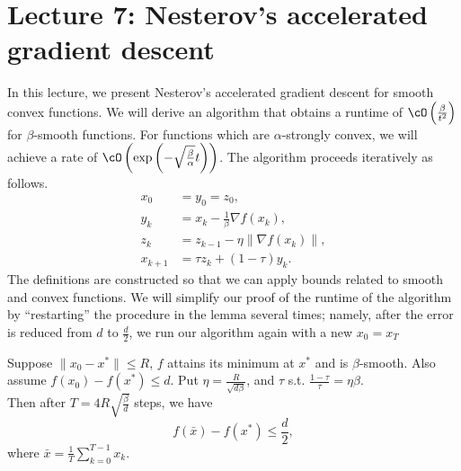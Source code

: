 \section{Lecture 7: Nesterov’s accelerated gradient descent}

In this lecture, we present Nesterov's accelerated gradient descent for smooth convex functions. We will derive an algorithm that obtains a runtime of $\cO \left(\frac{\beta}{t^2}\right)$ for $\beta$-smooth functions. For functions which are $\alpha$-strongly convex, we will achieve a rate of $\cO \left(\exp\left( -\sqrt{\frac{\beta}{\alpha}} t \right) \right)$. The algorithm proceeds iteratively as follows. 
\begin{align*}
x_0 &= y_0 = z_0, \\
y_k &= x_k - \frac{1}{\beta} \nabla f(x_k), \\
z_k &= z_{k -1} - \eta \|\nabla f(x_k)\|, \\
x_{k+1} &= \tau z_k + (1 - \tau) y_k.
\end{align*}
The definitions are constructed so that we can apply bounds related to smooth and convex functions. We will simplify our proof of the runtime of the algorithm by ``restarting'' the procedure in the lemma several times; namely, after the error is reduced from $d$ to $\frac{d}{2}$, we run our algorithm again with a new $x_0 = x_T$

\begin{lemma}
Suppose $\|x_0 - x^* \| \leq R$, $f$ attains its minimum at $x^*$ and is $\beta$-smooth. Also assume $f(x_0) -f(x^*) \leq d$.
Put $\eta = \frac{R}{\sqrt{d\beta}}$, and $\tau$ s.t. $\frac{1-\tau}{\tau} = \eta \beta$.\\
Then after $T = 4R\sqrt{\frac{\beta}{d}}$ steps, we have $$f(\bar{x})- f(x^*) \leq \frac{d}{2},$$ where $\bar{x} = \frac{1}{T} \sum_{k=0}^{T-1} x_k$.
\end{lemma}

